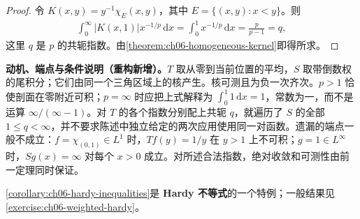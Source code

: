 \documentclass[../../main.tex]{subfiles}
\begin{document}
\begin{proof}
令 $K(x,y)=y^{-1}\chi_E(x,y)$，其中 $E=\{(x,y):x<y\}$。则
\begin{align*}
\int_0^\infty|K(x,1)|x^{-1/p}\,\mathrm dx
=\int_0^1x^{-1/p}\,\mathrm dx=\frac{p}{p-1}=q,
\end{align*}
这里 $q$ 是 $p$ 的共轭指数。由\cref{theorem:ch06-homogeneous-kernel}即得所求。
\end{proof}
\begin{remark}
\textbf{动机、端点与条件说明（重构新增）。}$T$ 取从零到当前位置的平均，$S$ 取带倒数权的尾积分；它们由同一个三角区域上的核产生。核可测且为负一次齐次。$p>1$ 恰使剖面在零附近可积；$p=\infty$ 时应把上式解释为 $\int_0^1 1\,\mathrm dx=1$，常数为一，而不是运算 $\infty/(\infty-1)$。对 $T$ 的各个指数分别配上共轭 $q$，就遍历了 $S$ 的全部 $1\leqslant q<\infty$，并不要求陈述中独立给定的两次应用使用同一对函数。遗漏的端点一般不成立：$f=\chi_{(0,1)}\in L^1$ 时，$Tf(y)=1/y$ 在 $y>1$ 上不可积；$g=1\in L^\infty$ 时，$Sg(x)=\infty$ 对每个 $x>0$ 成立。对所述合法指数，绝对收敛和可测性由前一定理同时保证。
\end{remark}
\cref{corollary:ch06-hardy-inequalities}是 \textbf{Hardy 不等式}的一个特例；一般结果见\cref{exercise:ch06-weighted-hardy}。

\end{document}
